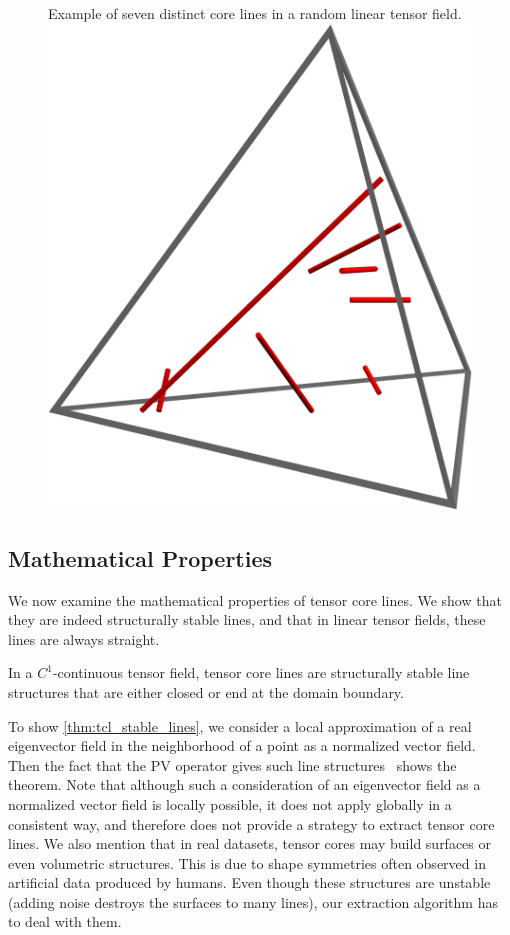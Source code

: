 \begin{figure}
    \begin{captionbeside}
        {Example of seven distinct core lines in a random linear tensor field.
        \label{fig:7lines}}
        \includegraphics[width=0.5\columnwidth]{figures/7lines}
    \end{captionbeside}
\end{figure}
%

\subsection{Mathematical Properties} %
\label{sub:mathematical_properties}
%
We now examine the mathematical properties of tensor core lines.
%
We show that they are indeed structurally stable lines, and that in linear
tensor fields, these lines are always straight.
%

%
\begin{theorem}\label{thm:tcl_stable_lines}
In a $C^1$-continuous tensor field, tensor core lines are structurally stable
line structures that are either closed or end at the domain boundary.
\end{theorem}
%
To show \cref{thm:tcl_stable_lines}, we consider a local approximation of a real
eigenvector field in the neighborhood of a point as a normalized vector field.
%
Then the fact that the \ac{PV} operator gives such line
structures~\cite{Peikert1999} shows the theorem.
%
Note that although such a consideration of an eigenvector field as a normalized
vector field is locally possible, it does not apply globally in a consistent
way, and therefore does not provide a strategy to extract tensor core lines.
%
We also mention that in real datasets, tensor cores may build surfaces or even
volumetric structures.
%
This is due to shape symmetries often observed in artificial data produced by
humans.
%
Even though these structures are unstable (adding noise destroys the surfaces to
many lines), our extraction algorithm has to deal with them.
%

